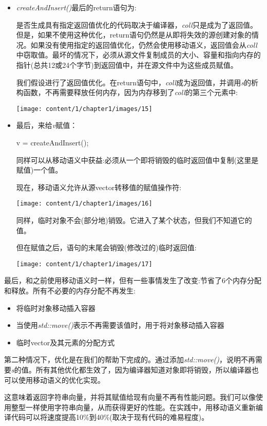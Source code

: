 \begin{itemize}
	\item \textit{createAndInsert()}最后的return语句为:

	\begin{cppcode}
	return coll;
}
	\end{cppcode}
	是否生成具有指定返回值优化的代码取决于编译器，\textit{coll}只是成为了返回值。但是，如果不使用这种优化，return语句仍然是从即将失效的源创建对象的情况。如果没有使用指定的返回值优化，仍然会使用移动语义，返回值会从\textit{coll}中窃取值。最坏的情况下，必须从源文件复制成员的大小、容量和指向内存的指针(总共12或24个字节)到返回值中，并在源文件中为这些成员赋值。

	我们假设进行了返回值优化。在return语句中，\textit{coll}成为返回值，并调用\textit{s}的析构函数，不再需要释放任何内存，因为内存移到了\textit{coll}的第三个元素中:
\begin{center}
		\texttt{[image: content/1/chapter1/images/15]}
	\end{center}
	\item 最后，来给\textit{v}赋值：
\begin{cppcode}
v = createAndInsert();
\end{cppcode}
	同样可以从移动语义中获益:必须从一个即将销毁的临时返回值中复制(这里是赋值)一个值。

	现在，移动语义允许从源vector转移值的赋值操作符:
\begin{center}
		\texttt{[image: content/1/chapter1/images/16]}
	\end{center}
	同样，临时对象不会(部分地)销毁。它进入了某个状态，但我们不知道它的值。

	但在赋值之后，语句的末尾会销毁(修改过的)临时返回值:
\begin{center}
		\texttt{[image: content/1/chapter1/images/17]}
	\end{center}
\end{itemize}

最后，和之前使用移动语义时一样，但有一些事情发生了改变:节省了6个内存分配和释放。所有不必要的内存分配不再发生:

\begin{itemize}
	\item 将临时对象移动插入容器
	\item 当使用\textit{std::move()}表示不再需要该值时，用于将对象移动插入容器
	\item 临时vector及其元素的分配方式
\end{itemize}

第二种情况下，优化是在我们的帮助下完成的。通过添加\textit{std::move()}，说明不再需要\textit{s}的值。所有其他优化都生效了，因为编译器知道对象即将销毁，所以编译器也可以使用移动语义的优化实现。

这意味着返回字符串向量，并将其赋值给现有向量不再有性能问题。我们可以像使用整型一样使用字符串向量，从而获得更好的性能。在实践中，用移动语义重新编译代码可以将速度提高10\%到40\%(取决于现有代码的难易程度)。



























